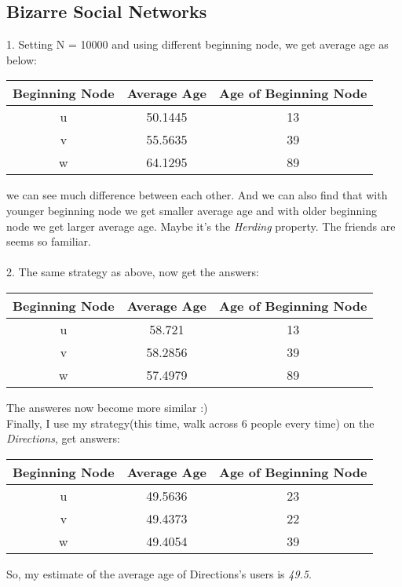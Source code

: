 \documentclass[11pt]{article} %
\begin{document}
\subsection{Bizarre Social Networks}
1. Setting N = 10000 and using different beginning node, we get average age as below: \\

\begin{table}[!hbp]
\centering
\begin{tabular}{|c|c|c|}
\hline
Beginning Node & Average Age & Age of Beginning Node \\
\hline
u & 50.1445 & 13\\
\hline
v & 55.5635 & 39 \\
\hline
w & 64.1295 & 89 \\
\hline
\end{tabular}
\end{table}

we can see much difference between each other. And we can also find that with younger beginning node we get smaller average age and with older beginning node we get larger average age. Maybe it's the \emph{Herding} property. The friends are seems so familiar.\\
\\
2. The same strategy as above, now get the answers:\\

\begin{table}[!hbp]
\centering
\begin{tabular}{|c|c|c|}
\hline
Beginning Node & Average Age & Age of Beginning Node \\
\hline
u & 58.721 & 13\\
\hline
v & 58.2856 & 39 \\
\hline
w & 57.4979 & 89 \\
\hline
\end{tabular}
\end{table}

The answeres now become more similar :) \\


Finally, I use my strategy(this time, walk across 6 people every time) on the \emph{Directions}, get answers:\\

\begin{table}[!hbp]
\centering
\begin{tabular}{|c|c|c|}
\hline
Beginning Node & Average Age & Age of Beginning Node \\
\hline
u & 49.5636 & 23\\
\hline
v & 49.4373 & 22 \\
\hline
w & 49.4054 & 39 \\
\hline
\end{tabular}
\end{table}

So, my estimate of the average age of Directions's users is \emph{49.5}.
\end{document}
